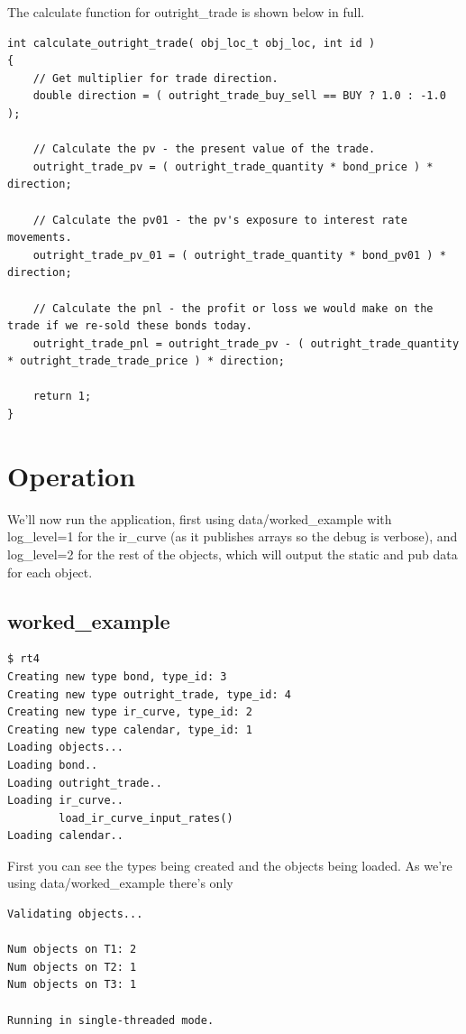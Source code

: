 \documentclass{report}
\begin{document}
The calculate function for outright_trade is shown below in full.

\begin{verbatim}
int calculate_outright_trade( obj_loc_t obj_loc, int id )
{
    // Get multiplier for trade direction.
    double direction = ( outright_trade_buy_sell == BUY ? 1.0 : -1.0 );

    // Calculate the pv - the present value of the trade.
    outright_trade_pv = ( outright_trade_quantity * bond_price ) * direction;

    // Calculate the pv01 - the pv's exposure to interest rate movements.
    outright_trade_pv_01 = ( outright_trade_quantity * bond_pv01 ) * direction;

    // Calculate the pnl - the profit or loss we would make on the trade if we re-sold these bonds today.
    outright_trade_pnl = outright_trade_pv - ( outright_trade_quantity * outright_trade_trade_price ) * direction;

    return 1;
}
\end{verbatim}

\section{Operation}

We'll now run the application, first using data/worked_example with log_level=1 for the ir_curve (as it publishes arrays so the debug is verbose), and log_level=2 for the rest of the objects, which will output the static and pub data for each object.

\subsection{worked_example}
 
\begin{verbatim}
$ rt4
Creating new type bond, type_id: 3
Creating new type outright_trade, type_id: 4
Creating new type ir_curve, type_id: 2
Creating new type calendar, type_id: 1
Loading objects...
Loading bond..
Loading outright_trade..
Loading ir_curve..
        load_ir_curve_input_rates()
Loading calendar..

\end{verbatim}

First you can see the types being created and the objects being loaded. As we're using data/worked_example there's only

\begin{verbatim}
Validating objects...

Num objects on T1: 2
Num objects on T2: 1
Num objects on T3: 1

Running in single-threaded mode.
\end{verbatim}
\end{document}
